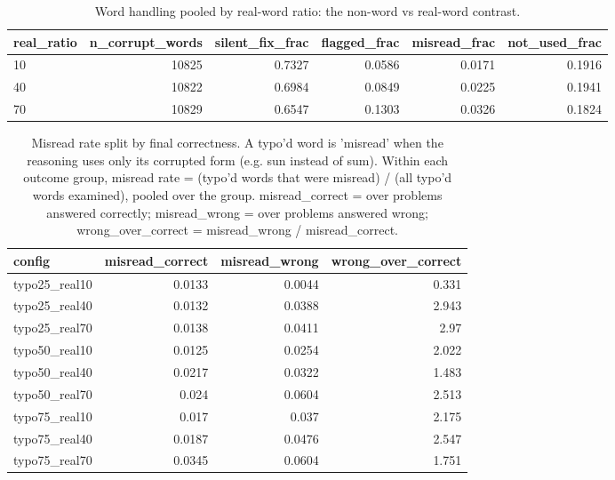 \documentclass[11pt]{article}
\begin{document}
\begin{table}[H]
\centering
\caption{Word handling pooled by real-word ratio: the non-word vs real-word contrast.}
\small
\begin{adjustbox}{max width=\textwidth}
\begin{tabular}{lrrrrr}
\toprule
\textbf{real\_ratio} & \textbf{n\_corrupt\_words} & \textbf{silent\_fix\_frac} & \textbf{flagged\_frac} & \textbf{misread\_frac} & \textbf{not\_used\_frac} \\
\midrule
10 & 10825 & 0.7327 & 0.0586 & 0.0171 & 0.1916 \\
40 & 10822 & 0.6984 & 0.0849 & 0.0225 & 0.1941 \\
70 & 10829 & 0.6547 & 0.1303 & 0.0326 & 0.1824 \\
\bottomrule
\end{tabular}
\end{adjustbox}
\end{table}

\begin{table}[H]
\centering
\caption{Misread rate split by final correctness. A typo'd word is 'misread' when the reasoning uses only its corrupted form (e.g. sun instead of sum). Within each outcome group, misread rate = (typo'd words that were misread) / (all typo'd words examined), pooled over the group. misread\_correct = over problems answered correctly; misread\_wrong = over problems answered wrong; wrong\_over\_correct = misread\_wrong / misread\_correct.}
\small
\begin{adjustbox}{max width=\textwidth}
\begin{tabular}{lrrr}
\toprule
\textbf{config} & \textbf{misread\_correct} & \textbf{misread\_wrong} & \textbf{wrong\_over\_correct} \\
\midrule
typo25\_real10 & 0.0133 & 0.0044 & 0.331 \\
typo25\_real40 & 0.0132 & 0.0388 & 2.943 \\
typo25\_real70 & 0.0138 & 0.0411 & 2.97 \\
typo50\_real10 & 0.0125 & 0.0254 & 2.022 \\
typo50\_real40 & 0.0217 & 0.0322 & 1.483 \\
typo50\_real70 & 0.024 & 0.0604 & 2.513 \\
typo75\_real10 & 0.017 & 0.037 & 2.175 \\
typo75\_real40 & 0.0187 & 0.0476 & 2.547 \\
typo75\_real70 & 0.0345 & 0.0604 & 1.751 \\
\bottomrule
\end{tabular}
\end{adjustbox}
\end{table}
\end{document}
